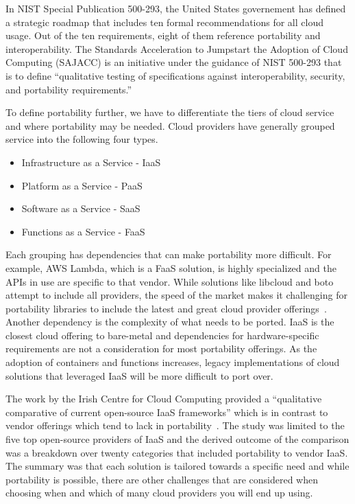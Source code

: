 In NIST Special Publication 500-293, the United States governement has defined a
strategic roadmap that includes ten formal recommendations for all cloud usage.
Out of the ten requirements, eight of them reference portability and
interoperability. The Standards Acceleration to Jumpstart the Adoption of Cloud
Computing (SAJACC) is an initiative under the guidance of NIST 500-293 that is
to define ``qualitative testing of specifications against interoperability,
security, and portability requirements.''~\cite{hid-sp18-518-NIST-293}

To define portability further, we have to differentiate the tiers of cloud
service and where portability may be needed. Cloud providers have generally
grouped service into the following four types.

\begin{itemize}
\item
  Infrastructure as a Service - IaaS
\item
  Platform as a Service - PaaS
\item
  Software as a Service - SaaS
\item
  Functions as a Service - FaaS
\end{itemize}

Each grouping has dependencies that can make portability more difficult. For
example, AWS Lambda, which is a FaaS solution, is highly specialized and the
APIs in use are specific to that vendor. While solutions like libcloud and boto
attempt to include all providers, the speed of the market makes it challenging
for portability libraries to include the latest and great cloud provider
offerings~\cite{hid-sp18-518-LibCloud}. Another dependency is the complexity of
what needs to be ported. IaaS is the closest cloud offering to bare-metal and
dependencies for hardware-specific requirements are not a consideration for most
portability offerings. As the adoption of containers and functions increases,
legacy implementations of cloud solutions that leveraged IaaS will be more
difficult to port over. 

The work by the Irish Centre for Cloud Computing provided a ``qualitative
comparative of current  open-source  IaaS frameworks'' which is in contrast to
vendor offerings which tend to lack in
portability~\cite{hid-sp18-518-Comp-study}. The study was limited to the five
top open-source providers of IaaS and the derived outcome of the comparison was
a breakdown over twenty categories that included portability to vendor IaaS. The
summary was that each solution is tailored towards a specific need and while
portability is possible, there are other challenges that are considered when
choosing when and which of many cloud providers you will end up using.

